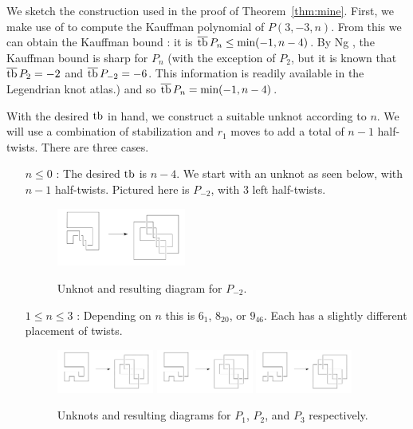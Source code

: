 We sketch the construction used in the proof of Theorem~\ref{thm:mine}. First, we make use of \cite{lu-zhong} to compute the Kauffman polynomial of $P(3, -3, n)$. From this we can obtain the Kauffman bound : it is $\overline{\operatorname{tb}}\,{P_n} \leq \text{min}(-1, n-4)$. By Ng \cite{ng}, the Kauffman bound is sharp for $P_n$ (with the exception of $P_2$, but it is known that $\overline{\operatorname{tb}}\, P_2 = -2$ and $\overline{\operatorname{tb}}\, P_{-2} = -6$. This information is readily available in the Legendrian knot atlas\cite{atlas}.) and so $\overline{\operatorname{tb}}\, P_n = \text{min} (-1, n-4)$.

With the desired $\operatorname{tb}$ in hand, we construct a suitable unknot according to $n$. We will use a combination of stabilization and $r_1$ moves to add a total of $n-1$ half-twists. There are three cases.

\begin{itemize}

    \item[$n \leq 0$ :]
        The desired $\operatorname{tb}$ is $n-4$. We start with an unknot as seen below, with $n-1$ half-twists. Pictured here is $P_{-2}$, with 3 left half-twists.
        \begin{figure}[h!]
            \centering
            \includegraphics[width=0.4\textwidth]{images/pretzel--2-construction.pdf}
            \label{fig:pretzel-2}
            \caption{Unknot and resulting diagram for $P_{-2}$.}
        \end{figure}

    \item[$1 \leq n \leq 3$ :]
        Depending on $n$ this is $6_1$, $8_{20}$, or $9_{46}$. Each has a slightly different placement of twists.
        \begin{figure}[ht!]
            \centering
            \includegraphics[width=0.3\textwidth]{images/pretzel-+1-construction.pdf} \hfill
            \includegraphics[width=0.3\textwidth]{images/pretzel-+2-construction.pdf} \hfill
            \includegraphics[width=0.3\textwidth]{images/pretzel-+3-construction.pdf}
            \label{fig:pretzel-singles}
            \caption{Unknots and resulting diagrams for $P_1$, $P_2$, and $P_3$ respectively.}
        \end{figure}


\end{itemize}
